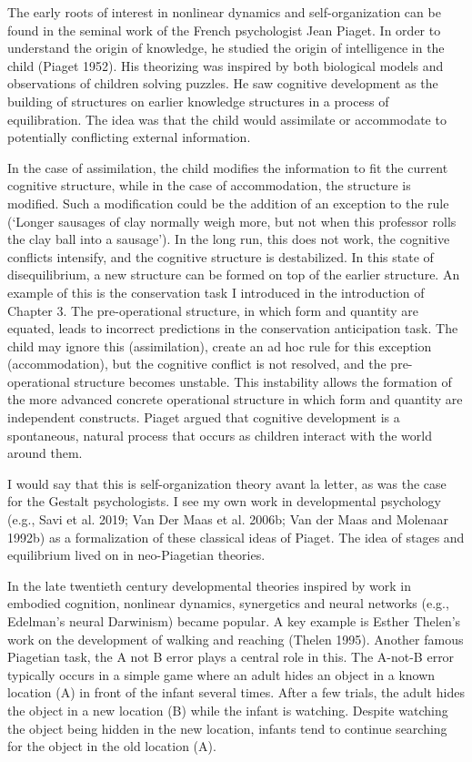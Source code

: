 \documentclass[
  letterpaper,
]{scrbook}
\begin{document}
The early roots of interest in nonlinear dynamics and self-organization
can be found in the seminal work of the French psychologist Jean Piaget.
In order to understand the origin of knowledge, he studied the origin of
intelligence in the child (Piaget 1952). His theorizing was inspired by
both biological models and observations of children solving puzzles. He
saw cognitive development as the building of structures on earlier
knowledge structures in a process of equilibration. The idea was that
the child would assimilate or accommodate to potentially conflicting
external information.

In the case of assimilation, the child modifies the information to fit
the current cognitive structure, while in the case of accommodation, the
structure is modified. Such a modification could be the addition of an
exception to the rule (`Longer sausages of clay normally weigh more, but
not when this professor rolls the clay ball into a sausage'). In the
long run, this does not work, the cognitive conflicts intensify, and the
cognitive structure is destabilized. In this state of disequilibrium, a
new structure can be formed on top of the earlier structure. An example
of this is the conservation task I introduced in the introduction of
Chapter 3. The pre-operational structure, in which form and quantity are
equated, leads to incorrect predictions in the conservation anticipation
task. The child may ignore this (assimilation), create an ad hoc rule
for this exception (accommodation), but the cognitive conflict is not
resolved, and the pre-operational structure becomes unstable. This
instability allows the formation of the more advanced concrete
operational structure in which form and quantity are independent
constructs. Piaget argued that cognitive development is a spontaneous,
natural process that occurs as children interact with the world around
them.

I would say that this is self-organization theory avant la letter, as
was the case for the Gestalt psychologists. I see my own work in
developmental psychology (e.g., Savi et al. 2019; Van Der Maas et al.
2006b; Van der Maas and Molenaar 1992b) as a formalization of these
classical ideas of Piaget. The idea of stages and equilibrium lived on
in neo-Piagetian theories.

In the late twentieth century developmental theories inspired by work in
embodied cognition, nonlinear dynamics, synergetics and neural networks
(e.g., Edelman's neural Darwinism) became popular. A key example is
Esther Thelen's work on the development of walking and reaching (Thelen
1995). Another famous Piagetian task, the A not B error plays a central
role in this. The A-not-B error typically occurs in a simple game where
an adult hides an object in a known location (A) in front of the infant
several times. After a few trials, the adult hides the object in a new
location (B) while the infant is watching. Despite watching the object
being hidden in the new location, infants tend to continue searching for
the object in the old location (A).
\end{document}
